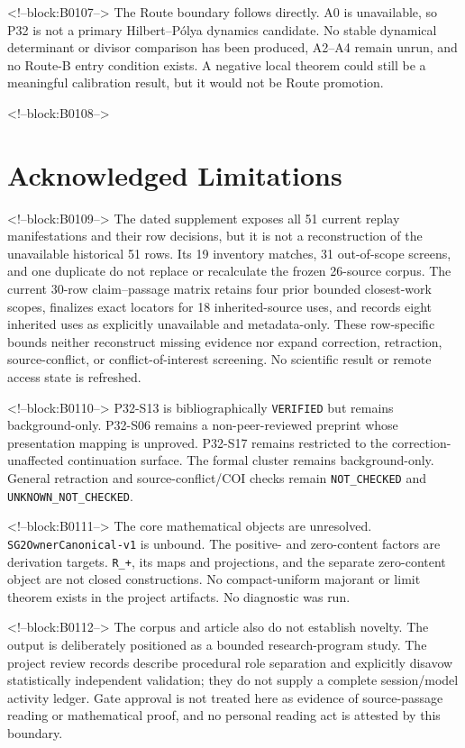\documentclass[11pt]{article}
\begin{document}
<!--block:B0107-->
The Route boundary follows directly. A0 is unavailable, so P32 is not a
primary Hilbert--Pólya dynamics candidate. No stable dynamical
determinant or divisor comparison has been produced, A2--A4 remain
unrun, and no Route-B entry condition exists. A negative local theorem
could still be a meaningful calibration result, but it would not be
Route promotion.

<!--block:B0108-->
\hypertarget{8-acknowledged-limitations}{%
\section{Acknowledged
Limitations}\label{8-acknowledged-limitations}}

<!--block:B0109-->
The dated supplement exposes all 51 current replay
manifestations and their row decisions, but it is not a reconstruction of the
unavailable historical 51 rows. Its 19 inventory matches, 31 out-of-scope screens,
and one duplicate do not replace or recalculate the frozen 26-source corpus. The
current 30-row claim--passage matrix retains four prior bounded closest-work scopes,
finalizes exact locators for 18 inherited-source uses, and records eight inherited
uses as explicitly unavailable and metadata-only. These row-specific bounds neither
reconstruct missing evidence nor expand correction, retraction, source-conflict, or
conflict-of-interest screening. No scientific result or remote access state is
refreshed.

<!--block:B0110-->
P32-S13 is bibliographically \texttt{VERIFIED} but remains background-only. P32-S06 remains
a non-peer-reviewed preprint whose presentation mapping is unproved.
P32-S17 remains restricted to the correction-unaffected continuation
surface. The formal cluster remains background-only. General retraction
and source-conflict/COI checks remain \texttt{NOT\_CHECKED} and
\texttt{UNKNOWN\_NOT\_CHECKED}.

<!--block:B0111-->
The core mathematical objects are unresolved.
\texttt{SG2OwnerCanonical-v1} is unbound. The positive- and zero-content
factors are derivation targets. \texttt{R\_+}, its maps and projections,
and the separate zero-content object are not closed constructions. No
compact-uniform majorant or limit theorem exists in the project
artifacts. No diagnostic was run.

<!--block:B0112-->
The corpus and article also do not establish novelty. The output is
deliberately positioned as a bounded research-program study.
The project review records describe procedural role separation and explicitly
disavow statistically independent validation; they do not supply a complete
session/model activity ledger. Gate approval is not treated here as evidence of
source-passage reading or mathematical proof, and no personal reading act is
attested by this boundary.
\end{document}
